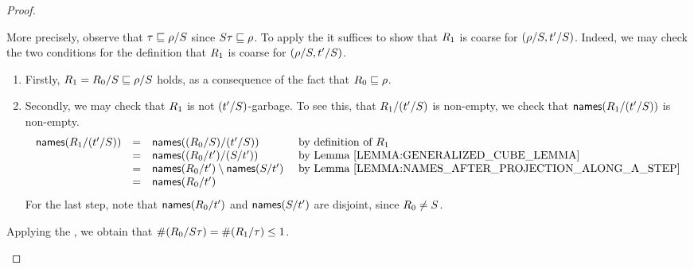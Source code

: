 \begin{proof}
\begin{enumerate}
  More precisely, observe that $\tau \sqsubseteq \rho/S$ since $S\tau \sqsubseteq \rho$.
  To apply the \ih it suffices to show that $R_1$ is coarse for $(\rho/S,t'/S)$.
  Indeed, we may check the two conditions
  for the definition that $R_1$ is coarse for $(\rho/S,t'/S)$.
  \begin{enumerate}
  \item Firstly, $R_1 = R_0/S \sqsubseteq \rho/S$ holds, as a consequence of the fact that $R_0 \sqsubseteq \rho$.
  \item Secondly, we may check that $R_1$ is not $(t'/S)$-garbage.
        To see this, \ie that $R_1/(t'/S)$ is non-empty,
        we check that $\mathsf{names}(R_1/(t'/S))$ is non-empty.
        \[
          \begin{array}{rcll}
          \names(\redex_1/(\tm'/\redextwo))
          & = & \names((\redex_0/\redextwo)/(\tm'/\redextwo)) & \text{ by definition of $\redex_1$} \\
          & = & \names((\redex_0/\tm')/(\redextwo/\tm')) & \text{ by \rlem{generalized_cube_lemma}} \\
          & = & \names(\redex_0/\tm') \setminus \names(\redextwo/\tm') & \text{ by \rlem{names_after_projection_along_a_step}} \\
          & = & \names(\redex_0/\tm')
          \end{array}
        \]
        For the last step, note that $\mathsf{names}(R_0/t')$ and $\mathsf{names}(S/t')$ are disjoint,
        since $R_0 \neq S$.
  \end{enumerate}
  Applying the \ih, we obtain that $\#(R_0/S\tau) = \#(R_1/\tau) \leq 1$.  
\end{enumerate}
\end{proof}

